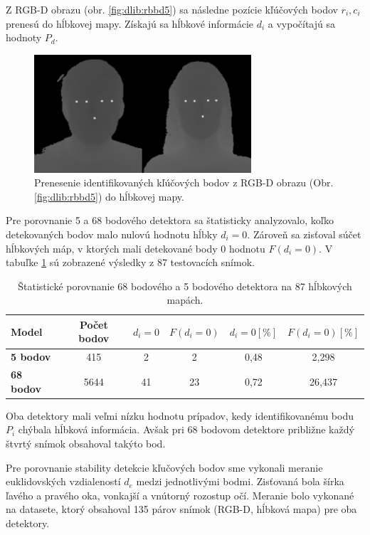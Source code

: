 \noindent Z RGB-D obrazu (obr. \ref{fig:dlib:rbbd5}) sa následne pozície kľúčových bodov $r_i, c_i$ prenesú do hĺbkovej mapy. Získajú sa hĺbkové informácie $d_i$ a vypočítajú sa hodnoty $P_d$. 

\begin{figure}[H]
	\centering
	\includegraphics[width=0.72\textwidth]{figures/depth_points.png}
	\caption{Prenesenie identifikovaných kľúčových bodov z RGB-D obrazu (Obr. \ref{fig:dlib:rbbd5}) do hĺbkovej mapy.}
	\label{fig:dlib:depth5}
\end{figure}

Pre porovnanie 5 a 68 bodového detektora sa štatisticky analyzovalo, koľko detekovaných bodov malo nulovú hodnotu hĺbky $d_i=0$. Zároveň sa zisťoval súčet hĺbkových máp, v ktorých mali detekované body 0 hodnotu $F(d_i=0)$. V tabuľke \ref{tab:dlib:compare} sú zobrazené výsledky z 87 testovacích snímok.  

\begin{table}[h]
	\caption{\label{tab:dlib:compare} Štatistické porovnanie 68 bodového a 5 bodového detektora na 87 hĺbkových mapách.}
	\centering
	\begin{tabular}{lccccc}
		\toprule
		\textbf{Model} & \textbf{Počet bodov} & \textbf{$d_i=0$} & \textbf{$F(d_i=0)$} & \textbf{$d_i=0 [\%]$ } & \textbf{$F(d_i=0) [\%]$} \\ 
		\midrule
		\textbf{5 bodov} 	& 415 	& 2		& 2		& 0,48	& 2,298 \\
		\textbf{68 bodov} 	& 5644	& 41 	& 23	& 0,72	& 26,437 \\
		\bottomrule
	\end{tabular}
\end{table}

Oba detektory mali veľmi nízku hodnotu prípadov, kedy identifikovanému bodu $P_i$ chýbala hĺbková informácia. Avšak pri 68 bodovom detektore približne každý štvrtý snímok obsahoval takýto bod. 


Pre porovnanie stability detekcie kľučových bodov sme vykonali meranie euklidovských vzdialeností $d_e$ medzi jednotlivými bodmi. Zisťovaná bola šírka ľavého a pravého oka, vonkajší a vnútorný rozostup očí. Meranie bolo vykonané na datasete, ktorý obsahoval 135 párov snímok (RGB-D, hĺbková mapa) pre oba detektory.

